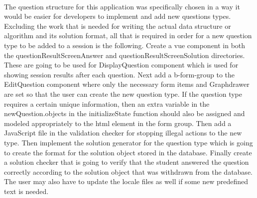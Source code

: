 \\[11pt]
The question structure for this application was specifically chosen in a way it would be easier for developers to implement and add new questions types. Excluding the work that is needed for writing the actual data structure or algorithm and its solution format, all that is required in order for a new question type to be added to a session is the following. Create a vue component in both the questionResultScreenAnswer and questionResultScreenSolution directories. These are going to be used for DisplayQuestion component which is used for showing session results after each question. Next add a b-form-group to the EditQuestion component where only the necessary form items and Graphdrawer are set so that the user can create the new question type. If the question type requires a certain unique information, then an extra variable in the newQuestion.objects in the initializeState function should also be assigned and modeled appropriately to the html element in the form group. Then add a JavaScript file in the validation checker for stopping illegal actions to the new type. Then implement the solution generator for the question type which is going to create the format for the solution object stored in the database. Finally create a solution checker that is going to verify that the student answered the question correctly according to the solution object that was withdrawn from the database. The user may also have to update the locale files as well if some new predefined text is needed.\\[11pt]



